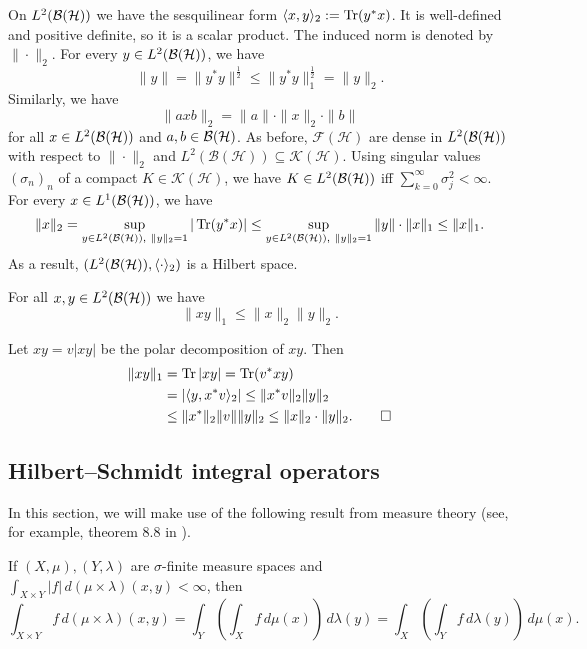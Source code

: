   On $L^2 (\operatorname{\mathcal{B} (\mathcal{H})})$ we have the sesquilinear form $\langle x, y\rangle_2 := \operatorname{Tr} (y^* x)$.
  It is well-defined and positive definite, so it is a scalar product. The induced norm is denoted by $\| \cdot \|_2$.
  For every $y \in L^2 (\operatorname{\mathcal{B} (\mathcal{H})})$, we have 
  $$\| y\| = \| y^* y\|^{\frac{1}{2}} \leq \| y^* y\|_1 ^{\frac{1}{2}} = \|y\|_2.$$
  Similarly, we have $$\| axb\|_2 = \| a\| \cdot \|x\|_2 \cdot \| b\|$$ for all $x \in L^2 (\operatorname{\mathcal{B} (\mathcal{H})})$
  and $a, b \in \operatorname{\mathcal{B} (\mathcal{H})}$. As before, $\mathcal{F} (\mathcal{H})$ are dense in $L^2 (\operatorname{\mathcal{B} (\mathcal{H})})$ with respect to $\| \cdot \|_2$ and $L^2 (\mathcal{B}(\mathcal{H})) \subseteq \mathcal{K} (\mathcal{H})$.
  Using singular values $(\sigma_n)_n$ of a compact $K \in \mathcal{K} (\mathcal{H})$, we have $K \in L^2 (\operatorname{\mathcal{B} (\mathcal{H})})$
  iff $\sum_{k = 0} ^\infty \sigma_j ^2 < \infty$.
  For every $x \in L^1 (\operatorname{\mathcal{B} (\mathcal{H})})$, we have 
  $$\| x\|_2 = \sup_{y \in L^2 (\mathcal{B}(\mathcal{H})),\ \| y\|_2 = 1} | \operatorname{Tr} (y^* x) | \leq \sup_{y \in L^2 (\operatorname{\mathcal{B} (\mathcal{H})}),\ \| y\|_2 = 1} \|y\| \cdot \| x\|_1 \leq \|x\|_1.$$
  As a result, $(L^2 (\operatorname{\mathcal{B} (\mathcal{H})}), \langle \cdot \rangle_2)$ is a Hilbert space.

\begin{theorem}
  For all $x, y \in L^2 (\operatorname{\mathcal{B} (\mathcal{H})})$ we have 
  $$\| xy\|_1 \leq \| x\|_2 \| y\|_2.$$
\end{theorem}

\begin{myproof}
  Let $xy = v|xy|$ be the polar decomposition of $xy$. Then 
  \begin{align*}
    \| xy\|_1 &= \operatorname{Tr} |xy| = \operatorname{Tr} (v^* xy)\\
    &= |\langle y, x^* v \rangle_2| \leq \| x^* v\|_2 \| y\|_2\\
    &\leq \| x^*\|_2 \| v\| \|y\|_2 \leq \| x\|_2 \cdot \|y\|_2. \qedhere
  \end{align*}
\end{myproof}

\subsection{Hilbert--Schmidt integral operators}

In this section, we will make use of the following result from measure theory 
(see, for example, theorem 8.8 in \cite{rudin}).

\begin{theorem}
  If $(X, \mu), (Y,\lambda)$ are $\sigma$-finite measure spaces and $\int_{X \times Y} |f|\, d(\mu \times \lambda) (x, y) < \infty$, then 
  $$\int_{X \times Y} f \, d(\mu \times \lambda)(x, y)= \int_Y \left(\int_X f\, d\mu(x)\right)\, d\lambda(y) = \int_X \left(\int_Y f\, d\lambda(y)\right)\, d\mu(x).$$
\end{theorem}

